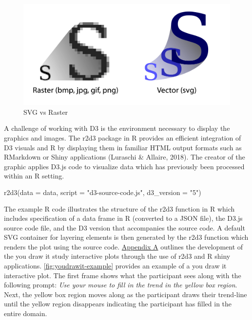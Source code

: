 \documentclass[print]{nuthesis}
\newenvironment{Shaded}{\begin{snugshade}}{\end{snugshade}}
\newcommand{\AttributeTok}[1]{\textcolor[rgb]{0.77,0.63,0.00}{#1}}
\newcommand{\FunctionTok}[1]{\textcolor[rgb]{0.00,0.00,0.00}{#1}}
\newcommand{\NormalTok}[1]{#1}
\newcommand{\StringTok}[1]{\textcolor[rgb]{0.31,0.60,0.02}{#1}}
\begin{document}
\begin{figure}[tbp]

{\centering \includegraphics[width=0.75\linewidth,]{images/raster-vs-vector} 

}

\caption{SVG vs Raster}\label{fig:raster-vs-vector}
\end{figure}

A challenge of working with D3 is the environment necessary to display the graphics and images.
The r2d3 package in R provides an efficient integration of D3 visuals and R by displaying them in familiar HTML output formats such as RMarkdown or Shiny applications (Luraschi \& Allaire, 2018).
The creator of the graphic applies D3.js code to visualize data which has previously been processed within an R setting.

\begin{Shaded}
\begin{Highlighting}[]
\FunctionTok{r2d3}\NormalTok{(}\AttributeTok{data =}\NormalTok{ data, }\AttributeTok{script =} \StringTok{"d3{-}source{-}code.js"}\NormalTok{, }
    \AttributeTok{d3\_version =} \StringTok{"5"}\NormalTok{)}
\end{Highlighting}
\end{Shaded}

The example R code illustrates the structure of the r2d3 function in R which includes specification of a data frame in R (converted to a JSON file), the D3.js source code file, and the D3 version that accompanies the source code.
A default SVG container for layering elements is then generated by the r2d3 function which renders the plot using the source code.
\protect\hyperlink{youdrawit-with-shiny}{Appendix A} outlines the development of the you draw it study interactive plots through the use of r2d3 and R shiny applications.
\cref{fig:youdrawit-example} provides an example of a you draw it interactive plot.
The first frame shows what the participant sees along with the following prompt: \textit{Use your mouse to fill in the trend in the yellow box region}.
Next, the yellow box region moves along as the participant draws their trend-line until the yellow region disappears indicating the participant has filled in the entire domain.
\end{document}
